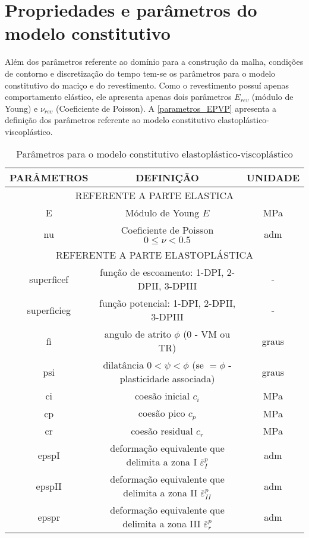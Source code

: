 \section{Propriedades e parâmetros do modelo constitutivo}
Além dos parâmetros referente ao domínio para a construção da malha, condições de contorno e discretização do tempo tem-se os parâmetros para o modelo constitutivo do maciço e do revestimento. Como o revestimento possuí apenas comportamento elástico, ele apresenta apenas dois parâmetros $E_{rev}$ (módulo de Young) e $\nu_{rev}$ (Coeficiente de Poisson). A \autoref{parametros_EPVP} apresenta a definição dos parâmetros referente ao modelo constitutivo elastoplástico-viscoplástico.
\begin{table}[H]
	\caption{Parâmetros para o modelo constitutivo elastoplástico-viscoplástico}
	\label{parametros_EPVP}
	\centering
	\small
	\renewcommand{\arraystretch}{1.25}
	\begin{tabular}{c c c}
		\hline
		\multicolumn{1}{c}{\textbf{PARÂMETROS}} &
		\multicolumn{1}{c}{\textbf{DEFINIÇÃO}} &
		\multicolumn{1}{c}{\textbf{UNIDADE}} \\
		\hline
		\multicolumn{3}{c}{REFERENTE A PARTE ELASTICA} \\
		\hline
		E & Módulo de Young $E$  & MPa \\			
		nu & Coeficiente de Poisson $0 \leq \nu<0.5$  & adm \\		
		\hline
		\multicolumn{3}{c}{REFERENTE A PARTE ELASTOPLÁSTICA} \\
		\hline
		superficef & função de escoamento: 1-DPI, 2-DPII, 3-DPIII  & - \\		
		superficieg & função potencial: 1-DPI, 2-DPII, 3-DPIII & - \\
		fi & angulo de atrito $\phi$ (0 - VM ou TR) & graus \\		
		psi & dilatância $0<\psi<\phi$ (se $=\phi$ - plasticidade associada) & graus \\	
		ci & coesão inicial $c_i$ & MPa \\
		cp & coesão pico $c_p$ & MPa \\
		cr & coesão residual $c_r$ & MPa \\ 
		epspI & deformação equivalente que delimita a zona I $\bar \varepsilon^p_{I}$ & adm \\
		epspII & deformação equivalente que delimita a zona II $\bar \varepsilon^p_{II}$ & adm \\
		epspr & deformação equivalente que delimita a zona III $\bar \varepsilon^p_{r}$ & adm \\	

\end{tabular}
\end{table}
